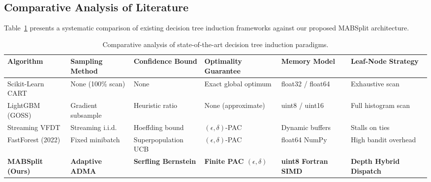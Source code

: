 \documentclass{article}
\begin{document}
	\subsection{Comparative Analysis of Literature}
	Table~\ref{tab:literature_comparison} presents a systematic comparison of existing decision tree induction frameworks against our proposed MABSplit architecture.

	\begin{table}[htbp]
		\centering
		\small
		\caption{Comparative analysis of state-of-the-art decision tree induction paradigms.}
		\label{tab:literature_comparison}
		\begin{tabularx}{\textwidth}{lXXXXX}
			\toprule
			\textbf{Algorithm} & \textbf{Sampling Method} & \textbf{Confidence Bound} & \textbf{Optimality Guarantee} & \textbf{Memory Model} & \textbf{Leaf-Node Strategy} \\
			\midrule
			Scikit-Learn CART & None (100\% scan) & None & Exact global optimum & float32 / float64 & Exhaustive scan \\
			LightGBM (GOSS) & Gradient subsample & Heuristic ratio & None (approximate) & uint8 / uint16 & Full histogram scan \\
			Streaming VFDT & Streaming i.i.d. & Hoeffding bound & $(\epsilon, \delta)$-PAC & Dynamic buffers & Stalls on ties \\
			FastForest (2022) & Fixed minibatch & Superpopulation UCB & $(\epsilon, \delta)$-PAC & float64 NumPy & High bandit overhead \\
			\textbf{MABSplit (Ours)} & \textbf{Adaptive ADMA} & \textbf{Serfling Bernstein} & \textbf{Finite PAC $(\epsilon, \delta)$} & \textbf{uint8 Fortran SIMD} & \textbf{Depth Hybrid Dispatch} \\
			\bottomrule
		\end{tabularx}
	\end{table}
\end{document}
